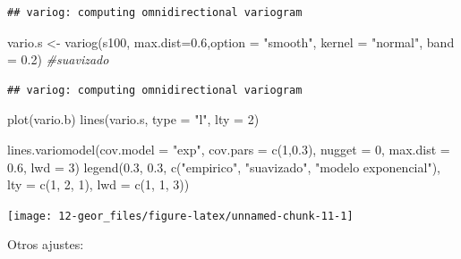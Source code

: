 \documentclass[
  spanish,
]{book}
\newenvironment{Shaded}{\begin{snugshade}}{\end{snugshade}}
\newcommand{\AttributeTok}[1]{\textcolor[rgb]{0.77,0.63,0.00}{#1}}
\newcommand{\CommentTok}[1]{\textcolor[rgb]{0.56,0.35,0.01}{\textit{#1}}}
\newcommand{\DecValTok}[1]{\textcolor[rgb]{0.00,0.00,0.81}{#1}}
\newcommand{\FloatTok}[1]{\textcolor[rgb]{0.00,0.00,0.81}{#1}}
\newcommand{\FunctionTok}[1]{\textcolor[rgb]{0.00,0.00,0.00}{#1}}
\newcommand{\NormalTok}[1]{#1}
\newcommand{\OtherTok}[1]{\textcolor[rgb]{0.56,0.35,0.01}{#1}}
\newcommand{\StringTok}[1]{\textcolor[rgb]{0.31,0.60,0.02}{#1}}
\theoremstyle{break}
\theoremstyle{definition}
\theoremstyle{definition}
\theoremstyle{definition}
\theoremstyle{definition}
\theoremstyle{remark}
\begin{document}
\begin{verbatim}
## variog: computing omnidirectional variogram
\end{verbatim}

\begin{Shaded}
\begin{Highlighting}[]
\NormalTok{vario.s }\OtherTok{\textless{}{-}} \FunctionTok{variog}\NormalTok{(s100, }\AttributeTok{max.dist=}\FloatTok{0.6}\NormalTok{,}\AttributeTok{option =} \StringTok{"smooth"}\NormalTok{, }\AttributeTok{kernel =} \StringTok{"normal"}\NormalTok{, }\AttributeTok{band =} \FloatTok{0.2}\NormalTok{)  }\CommentTok{\#suavizado}
\end{Highlighting}
\end{Shaded}

\begin{verbatim}
## variog: computing omnidirectional variogram
\end{verbatim}

\begin{Shaded}
\begin{Highlighting}[]
\FunctionTok{plot}\NormalTok{(vario.b)}
\FunctionTok{lines}\NormalTok{(vario.s, }\AttributeTok{type =} \StringTok{"l"}\NormalTok{, }\AttributeTok{lty =} \DecValTok{2}\NormalTok{)}

\FunctionTok{lines.variomodel}\NormalTok{(}\AttributeTok{cov.model =} \StringTok{"exp"}\NormalTok{, }\AttributeTok{cov.pars =} \FunctionTok{c}\NormalTok{(}\DecValTok{1}\NormalTok{,}\FloatTok{0.3}\NormalTok{), }\AttributeTok{nugget =} \DecValTok{0}\NormalTok{, }\AttributeTok{max.dist =} \FloatTok{0.6}\NormalTok{, }\AttributeTok{lwd =} \DecValTok{3}\NormalTok{)}
\FunctionTok{legend}\NormalTok{(}\FloatTok{0.3}\NormalTok{, }\FloatTok{0.3}\NormalTok{, }\FunctionTok{c}\NormalTok{(}\StringTok{"empirico"}\NormalTok{, }\StringTok{"suavizado"}\NormalTok{, }\StringTok{"modelo exponencial"}\NormalTok{), }\AttributeTok{lty =} \FunctionTok{c}\NormalTok{(}\DecValTok{1}\NormalTok{, }\DecValTok{2}\NormalTok{, }\DecValTok{1}\NormalTok{), }\AttributeTok{lwd =} \FunctionTok{c}\NormalTok{(}\DecValTok{1}\NormalTok{, }\DecValTok{1}\NormalTok{, }\DecValTok{3}\NormalTok{))}
\end{Highlighting}
\end{Shaded}

\begin{center}\texttt{[image: 12-geor\_files/figure-latex/unnamed-chunk-11-1]} \end{center}

Otros ajustes:
\end{document}
